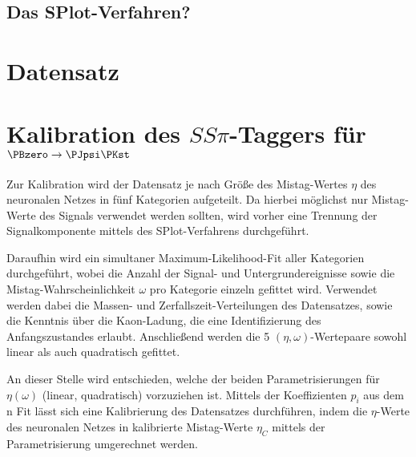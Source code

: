 



\subsection{Das SPlot-Verfahren?}

\section{Datensatz}


\section{\texorpdfstring{Kalibration des $SS\pi$-Taggers für $\PBzero \to \PJpsi \PKst$}{Kalibration des SSpi-Taggers für B0 -> JpsiKst}}

Zur Kalibration wird der Datensatz je nach Größe des Mistag-Wertes $\eta$ des neuronalen Netzes in fünf Kategorien aufgeteilt.
Da hierbei möglichst nur Mistag-Werte des Signals verwendet werden sollten, wird vorher eine Trennung der Signalkomponente mittels des SPlot-Verfahrens durchgeführt.

Daraufhin wird ein simultaner Maximum-Likelihood-Fit aller Kategorien durchgeführt, wobei die Anzahl der Signal- und Untergrundereignisse sowie die Mistag-Wahrscheinlichkeit $\omega$ pro Kategorie einzeln gefittet wird.
Verwendet werden dabei die Massen- und Zerfallszeit-Verteilungen des Datensatzes, sowie die Kenntnis über die Kaon-Ladung, die eine Identifizierung des Anfangszustandes erlaubt.
Anschließend werden die 5 $(\eta, \omega)$-Wertepaare sowohl linear als auch quadratisch gefittet.

An dieser Stelle wird entschieden, welche der beiden Parametrisierungen für $\eta(\omega)$ (linear, quadratisch) vorzuziehen ist.
Mittels der Koeffizienten $p_i$ aus dem n Fit lässt sich eine Kalibrierung des Datensatzes durchführen, indem die $η$-Werte des neuronalen Netzes in kalibrierte Mistag-Werte $η_C$ mittels der Parametrisierung umgerechnet werden.

